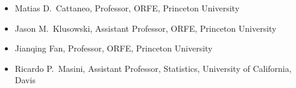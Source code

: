 \documentclass{wgu-cv}
\begin{document}
\vspace*{3mm}


\vspace*{-3mm}

\begin{itemize}

  \item
    Matias D.\ Cattaneo,
    Professor,
    ORFE,
    Princeton University

  \item
    Jason M.\ Klusowski,
    Assistant Professor,
    ORFE,
    Princeton University

  \item
    Jianqing Fan,
    Professor,
    ORFE,
    Princeton University

  \item
    Ricardo P.\ Masini,
    Assistant Professor,
    Statistics,
    University of California, Davis

\end{itemize}
\end{document}
